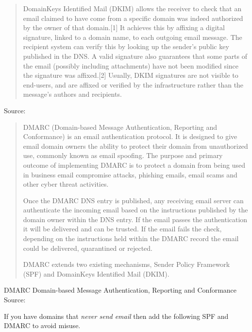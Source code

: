 \documentclass[Screen16to9,17pt]{foils}
\begin{document}

\begin{quote}
DomainKeys Identified Mail (DKIM) allows the receiver to check that an email claimed to have come from a specific domain was indeed authorized by the owner of that domain.[1] It achieves this by affixing a digital signature, linked to a domain name, to each outgoing email message. The recipient system can verify this by looking up the sender's public key published in the DNS. A valid signature also guarantees that some parts of the email (possibly including attachments) have not been modified since the signature was affixed.[2] Usually, DKIM signatures are not visible to end-users, and are affixed or verified by the infrastructure rather than the message's authors and recipients.
\end{quote}

Source: \\{\footnotesize
{}}


\begin{quote}\footnotesize
DMARC (Domain-based Message Authentication, Reporting and Conformance) is an email authentication protocol. It is designed to give email domain owners the ability to protect their domain from unauthorized use, commonly known as email spoofing. The purpose and primary outcome of implementing DMARC is to protect a domain from being used in business email compromise attacks, phishing emails, email scams and other cyber threat activities.

Once the DMARC DNS entry is published, any receiving email server can authenticate the incoming email based on the instructions published by the domain owner within the DNS entry. If the email passes the authentication it will be delivered and can be trusted. If the email fails the check, depending on the instructions held within the DMARC record the email could be delivered, quarantined or rejected.

DMARC extends two existing mechanisms, Sender Policy Framework (SPF) and DomainKeys Identified Mail (DKIM).
\end{quote}
DMARC Domain-based Message Authentication, Reporting and Conformance\\
Source: \\{\footnotesize
{}}


If you have domains that \emph{never send email} then add the following SPF and DMARC to avoid misuse.
\end{document}
